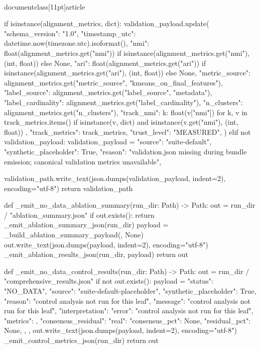 \\documentclass[11pt]{article}
\begin{document}
\begin{CodeBlock}
    if isinstance(alignment_metrics, dict):
        validation_payload.update(
            {
                "schema_version": "1.0",
                "timestamp_utc": datetime.now(timezone.utc).isoformat(),
                "nmi": float(alignment_metrics.get("nmi")) if isinstance(alignment_metrics.get("nmi"), (int, float)) else None,
                "ari": float(alignment_metrics.get("ari")) if isinstance(alignment_metrics.get("ari"), (int, float)) else None,
                "metric_source": alignment_metrics.get("metric_source", "kmeans_on_final_features"),
                "label_source": alignment_metrics.get("label_source", "metadata"),
                "label_cardinality": alignment_metrics.get("label_cardinality"),
                "n_clusters": alignment_metrics.get("n_clusters"),
                "track_nmi": {
                    k: float(v["nmi"])
                    for k, v in track_metrics.items()
                    if isinstance(v, dict) and isinstance(v.get("nmi"), (int, float))
                },
                "track_metrics": track_metrics,
                "trust_level": "MEASURED",
            }
        )
    elif not validation_payload:
        validation_payload = {
            "source": "suite-default",
            "synthetic_placeholder": True,
            "reason": "validation.json missing during bundle emission; canonical validation metrics unavailable",
        }

    validation_path.write_text(json.dumps(validation_payload, indent=2), encoding="utf-8")
    return validation_path


def _emit_no_data_ablation_summary(run_dir: Path) -> Path:
    out = run_dir / "ablation_summary.json"
    if out.exists():
        return _emit_ablation_summary_json(run_dir)
    payload = _build_ablation_summary_payload({}, None)
    out.write_text(json.dumps(payload, indent=2), encoding="utf-8")
    _emit_ablation_results_json(run_dir, payload)
    return out


def _emit_no_data_control_results(run_dir: Path) -> Path:
    out = run_dir / "comprehensive_results.json"
    if not out.exists():
        payload = {
            "status": "NO_DATA",
            "source": "suite-default-placeholder",
            "synthetic_placeholder": True,
            "reason": "control analysis not run for this leaf",
            "message": "control analysis not run for this leaf",
            "interpretation": {
                "error": "control analysis not run for this leaf",
                "metrics": {},
                "consensus_residual": {
                    "real": {
                        "consensus_pct": None,
                        "residual_pct": None,
                    }
                },
            },
        }
        out.write_text(json.dumps(payload, indent=2), encoding="utf-8")
    _emit_control_metrics_json(run_dir)
    return out



\end{CodeBlock}
\end{document}
